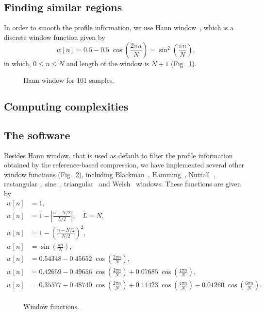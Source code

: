 \subsection{Finding similar regions}

In order to smooth the profile information, we use Hann window~\cite{blackman1959particular}, which is a discrete window function given by
\begin{equation}
  \label{eq.hann}
  w[n]=0.5-0.5\;\cos \left({\frac {2\pi n}{N}}\right)=\sin ^{2}\left({\frac {\pi n}{N}}\right),
\end{equation}
in which, $0\le n\le N$ and length of the window is $N+1$ (Fig.~\ref{fig.hann}).

\begin{figure}[!h]
\centering
\caption{Hann window for 101 samples.}
\label{fig.hann}
\end{figure}

\subsection{Computing complexities}

\subsection{The software}
\label{subsec.software}

Besides Hann window, that is used as default to filter the profile information obtained by the reference-based compression, we have implemented several other window functions (Fig.~\ref{fig.filters}), including Blackman~\cite{blackman1959particular}, Hamming~\cite{tukey1949measuring}, Nuttall~\cite{nuttall1981some}, rectangular~\cite{oppenheim1999discrete}, sine~\cite{harris1978use}, triangular~\cite{bartlett1950periodogram} and Welch~\cite{welch1967use} windows. These functions are given by
\begin{align}
  w[n] &= 1,
  \tag*{(rectangular)} \\
  w[n] &= 1-\left|\tfrac {n-N/2}{L/2}\right|, \quad L=N,
  \tag*{(triangular/Bartlett)} \\
  w[n] &= 1-\left(\tfrac {n-N/2}{N/2}\right)^{2},
  \tag*{(Welch)} \\
  w[n] &= \sin \left(\tfrac {\pi n}{N}\right),
  \tag*{(sine)} \\
  w[n] &= 0.54348-0.45652\;\cos \left(\tfrac {2\pi n}{N}\right),
  \tag*{(Hamming)} \\
  w[n] &= 0.42659-0.49656\;\cos \left(\tfrac {2\pi n}{N}\right)+0.07685\;\cos \left(\tfrac {4\pi n}{N}\right),
  \tag*{(Blackman)} \\
  w[n] &= 0.35577-0.48740\;\cos \left(\tfrac {2\pi n}{N}\right)+0.14423\;\cos \left(\tfrac {4\pi n}{N}\right)-0.01260\;\cos \left(\tfrac {6\pi n}{N}\right).
  \tag*{(Nuttall)} \\
\end{align}

\begin{figure}[!h]
\centering
\caption{Window functions.}
\label{fig.filters}
\end{figure}